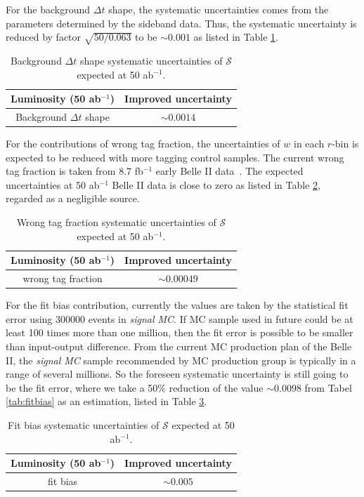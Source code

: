 For the background $\Delta t$ shape, the systematic uncertainties comes from the parameters determined by the sideband data. Thus, the systematic uncertainty is reduced by factor $\sqrt{50/0.063}$ to be $\sim 0.001$ as listed in Table \ref{tab:bkg_shape}.

\begin{table}[htpb]
	\centering
	\caption{ Background $\Delta t$ shape systematic uncertainties of $\mathcal{S}$ expected at 50 ab$^{-1}$.}
	\label{tab:bkg_shape}
	\begin{tabular}{c| c}
		\hline
		Luminosity (50 ab$^{-1}$) & Improved uncertainty \\
		\hline
		Background $\Delta t$ shape &  $\sim0.0014$ \\
		\hline
	\end{tabular}
\end{table}

For the contributions of wrong tag fraction, the uncertainties of $w$ in each $r$-bin is expected to be reduced with more tagging control samples. The current wrong tag fraction is taken from 8.7 fb$^{-1}$ early Belle II data~\cite{abudinen2020first}. The expected uncertainties at 50 ab$^{-1}$ Belle II data is close to zero as listed in Table \ref{tab:wtag_50ab}, regarded as a negligible source.

\begin{table}[htpb]
	\centering
	\caption{ Wrong tag fraction systematic uncertainties of $\mathcal{S}$ expected at 50 ab$^{-1}$.}
	\label{tab:wtag_50ab}
	\begin{tabular}{c| c}
		\hline
		Luminosity (50 ab$^{-1}$) & Improved uncertainty \\
		\hline
		wrong tag fraction &  $\sim0.00049$\\
		\hline
	\end{tabular}
\end{table}

For the fit bias contribution, currently the values are taken by the statistical fit error using 300000 events in \textit{signal MC}. If MC sample used in future could be at least 100 times more than one million, then the fit error is possible to be smaller than input-output difference. From the current MC production plan of the Belle II, the  \textit{signal MC} sample recommended by MC production group is typically in a range of several millions. So the foreseen systematic uncertainty is still going to be the fit error, where we take a 50\% reduction of the value $\sim0.0098$ from Tabel \ref{tab:fitbias} as an estimation, listed in Table \ref{tab:fitbias_full}.
\begin{table}[htpb]
	\centering
	\caption{ Fit bias systematic uncertainties of $\mathcal{S}$ expected at 50 ab$^{-1}$.}
	\label{tab:fitbias_full}
	\begin{tabular}{c| c}
		\hline
		Luminosity (50 ab$^{-1}$) & Improved uncertainty \\
		\hline
		fit bias &  $\sim 0.005$ \\
		\hline
	\end{tabular}
\end{table}

